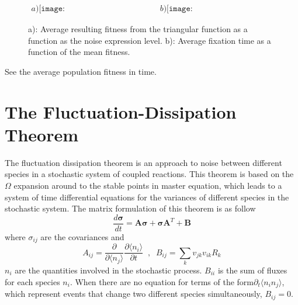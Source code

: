 \begin{figure}[H]
\begin{center}$
\begin{array}{cc}
a)\texttt{[image: FitnessfunctionSigma.pdf]} &
b)\texttt{[image: AveragetimeFitness.pdf]}
\end{array}$
\end{center}
\caption{a): Average resulting fitness from the triangular function as a function as the noise expression level. b): Average fixation time as a function of the mean fitness.}
\label{Fig7.4}
\end{figure}
See the average population fitness in time.
\section{The Fluctuation-Dissipation Theorem}
The fluctuation dissipation theorem is an approach to noise between different species in a stochastic system of coupled reactions. This theorem is based on the $\Omega$ expansion around to the stable points in  master equation\cite{Kampen}, which leads to a system of time differential equations for the variances of  different species in the stochastic system. The matrix formulation of this theorem is as follow\cite{Paulsson2005}  
\begin{equation}
\frac{d\boldsymbol{\sigma}}{dt}=\mathbf{A}\boldsymbol{\sigma} + \boldsymbol{\sigma}\mathbf{A}^{T} + \mathbf{B}
\end{equation}
where $\sigma_{ij}$ are the covariances and
\begin{equation}
A_{ij}=\frac{\partial}{\partial \langle n_j \rangle}\frac{\partial\langle n_i\rangle}{\partial t}\;\; ,\;\; B_{ij}=\sum\limits_{k}v_{jk}v_{ik}R_{k}
\end{equation}
$n_{i}$ are the quantities involved in the stochastic process. $B_{ii}$ is the sum of fluxes for each species $n_{i}$. When there are no equation for terms of the form$\partial_t\langle n_i n_j\rangle$, which represent events that change two different species simultaneously, $B_{ij}=0$\cite{Paulsson2005}. 

